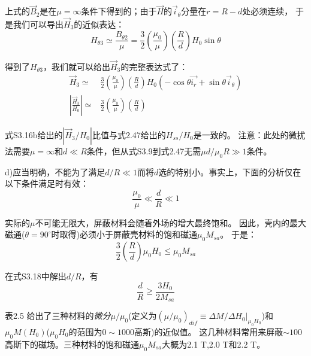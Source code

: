 上式的$\vec{B}_2$是在$\mu=\infty$条件下得到的；由于$\vec{H}$的$\vec{i}_\theta$分量在$r=R-d$处必须连续，
于是我们可以导出$\vec{H}_3$的近似表达：
\begin{equation*}
H_{\theta 3}\simeq \frac{B_{\theta 2}}{\mu}=\frac{3}{2}\left(\frac{\mu_0}{\mu}\right)\left(\frac{R}{d}\right)H_0\sin\theta \tag{S3.15}
\end{equation*}

得到了$H_{\theta 3}$，我们就可以给出$\vec{H}_3$的完整表达式了：
\begin{align}
\vec{H}_3\simeq &\frac{3}{2}\left(\frac{\mu_0}{\mu}\right)\left(\frac{R}{d}\right)H_0(-\cos\theta\vec{i_r}+\sin\theta\vec{i}_\theta) \nonumber\tag{S3.16a}\\
\left|\frac{\vec{H}_3}{H_0}\right|\simeq& \frac{3}{2}\left(\frac{\mu_0}{\mu}\right)\left(\frac{R}{d}\right) \nonumber\tag{S3.16b}
\end{align}

式S3.16b给出的$\left|{\vec{H}_3}/{H_0}\right|$比值与式2.47给出的$H_{ss}/H_0$是一致的。
注意：此处的微扰法需要$\mu=\infty$和$d\ll R$条件，但从式S3.9到式2.47无需$\mu d/\mu_0 R \gg 1$条件。

d)应当明确，不能为了满足$d/R \ll 1$而将$d$选的特别小。事实上，下面的分析仅在以下条件满足时有效：
\begin{equation*}
\frac{\mu_0}{\mu} \ll \frac{d}{R} \ll 1 \tag{S3.17}
\end{equation*}

实际的$\mu$不可能无限大，屏蔽材料会随着外场的增大最终饱和。
因此，壳内的最大磁通($\theta=90^\circ$时取得)必须小于屏蔽壳材料的饱和磁通$\mu_0 M_{sa}$。
于是：
\begin{equation*}
\frac{3}{2}\left(\frac{R}{d}\right)\mu_0 H_0 \le \mu_0 M_{sa}  \tag{S3.18}
\end{equation*}

在式S3.18中解出$d/R$，有
\begin{equation*}
\frac{d}{R}\ge \frac{3H_0}{2M_{sa}}  \tag{2.48}
\end{equation*}

表2.5 给出了三种材料的\textit{微分}$\mu/\mu_0$(定义为$(\mu/\mu_0)_{dif}\equiv \Delta M/ \Delta H_0 |_{\mu_0 H_0}$)和$\mu_0M(H_0)$($\mu_0 H_0$的范围为$0\sim 1000$高斯)的近似值。
这几种材料常用来屏蔽$\sim 100$高斯下的磁场。三种材料的饱和磁通$\mu_0 M_{sa}$大概为2.1 T,2.0 T和2.2 T。

